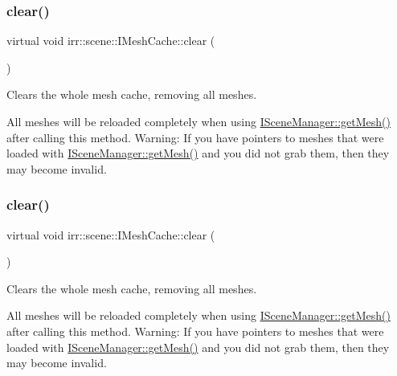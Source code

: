 \subsubsection{\texorpdfstring{clear()}{clear()}\hspace{0.1cm}{\footnotesize\ttfamily [1/2]}}
{\footnotesize\ttfamily virtual void irr\+::scene\+::\+I\+Mesh\+Cache\+::clear (\begin{DoxyParamCaption}{ }\end{DoxyParamCaption})\hspace{0.3cm}{\ttfamily [pure virtual]}}



Clears the whole mesh cache, removing all meshes. 

All meshes will be reloaded completely when using \hyperlink{classirr_1_1scene_1_1ISceneManager_a63894c3f3d46cfc385116f1705935e03}{I\+Scene\+Manager\+::get\+Mesh()} after calling this method. Warning\+: If you have pointers to meshes that were loaded with \hyperlink{classirr_1_1scene_1_1ISceneManager_a63894c3f3d46cfc385116f1705935e03}{I\+Scene\+Manager\+::get\+Mesh()} and you did not grab them, then they may become invalid. \mbox{\label{classirr_1_1scene_1_1IMeshCache_ad92d924e558c3a7504f9154ee29b1569}} 
\subsubsection{\texorpdfstring{clear()}{clear()}\hspace{0.1cm}{\footnotesize\ttfamily [2/2]}}
{\footnotesize\ttfamily virtual void irr\+::scene\+::\+I\+Mesh\+Cache\+::clear (\begin{DoxyParamCaption}{ }\end{DoxyParamCaption})\hspace{0.3cm}{\ttfamily [pure virtual]}}



Clears the whole mesh cache, removing all meshes. 

All meshes will be reloaded completely when using \hyperlink{classirr_1_1scene_1_1ISceneManager_a63894c3f3d46cfc385116f1705935e03}{I\+Scene\+Manager\+::get\+Mesh()} after calling this method. Warning\+: If you have pointers to meshes that were loaded with \hyperlink{classirr_1_1scene_1_1ISceneManager_a63894c3f3d46cfc385116f1705935e03}{I\+Scene\+Manager\+::get\+Mesh()} and you did not grab them, then they may become invalid. \mbox{\label{classirr_1_1scene_1_1IMeshCache_a9f3e20b8e0f66d59bc454a311d13bbee}} 
